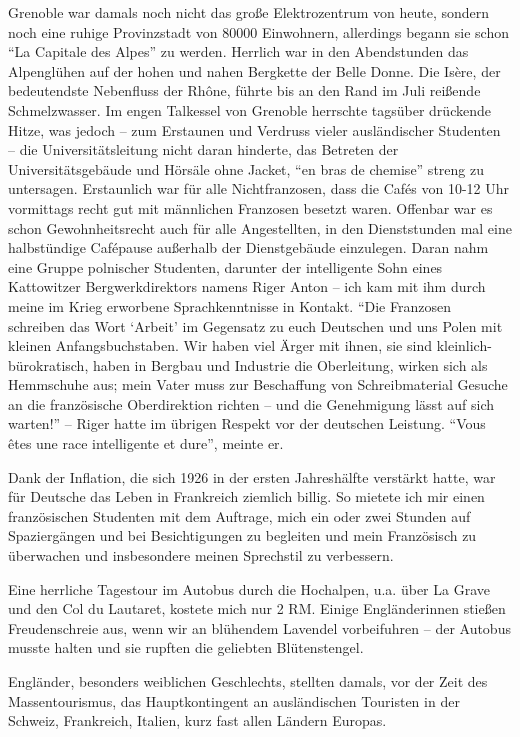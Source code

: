 Grenoble war damals noch nicht das große Elektrozentrum von heute, sondern noch eine ruhige Provinzstadt von \num{80000} Einwohnern, allerdings begann sie schon \enquote{La Capitale des Alpes} zu werden. Herrlich war in den Abendstunden das Alpenglühen auf der hohen und nahen Bergkette der Belle Donne. Die Isère, der bedeutendste Nebenfluss der Rhône, führte bis an den Rand im Juli reißende Schmelzwasser. Im engen Talkessel von Grenoble herrschte tagsüber drückende Hitze, was jedoch -- zum Erstaunen und Verdruss vieler ausländischer Studenten -- die Universitätsleitung nicht daran hinderte, das Betreten der Universitätsgebäude und Hörsäle ohne Jacket, \enquote{en bras de chemise} streng zu untersagen. Erstaunlich war für alle Nichtfranzosen, dass die Cafés von 10-12 Uhr vormittags recht gut mit männlichen Franzosen besetzt waren. Offenbar war es schon Gewohnheitsrecht auch für alle Angestellten, in den Dienststunden mal eine halbstündige Cafépause außerhalb der Dienstgebäude einzulegen. Daran nahm eine Gruppe polnischer Studenten, darunter der intelligente Sohn eines Kattowitzer Bergwerkdirektors namens Riger Anton -- ich kam mit ihm durch meine im Krieg erworbene Sprachkenntnisse in Kontakt. \enquote{Die Franzosen schreiben das Wort \enquote{Arbeit} im Gegensatz zu euch Deutschen und uns Polen mit kleinen Anfangsbuchstaben. Wir haben viel Ärger mit ihnen, sie sind kleinlich-bürokratisch, haben in Bergbau und Industrie die Oberleitung, wirken sich als Hemmschuhe aus; mein Vater muss zur Beschaffung von Schreibmaterial Gesuche an die französische Oberdirektion richten -- und die Genehmigung lässt auf sich warten!} -- Riger hatte im übrigen Respekt vor der deutschen Leistung. \enquote{Vous êtes une race intelligente et dure}, meinte er.

Dank der Inflation, die sich 1926 in der ersten Jahreshälfte verstärkt hatte, war für Deutsche das Leben in Frankreich ziemlich billig. So mietete ich mir einen französischen Studenten mit dem Auftrage, mich ein oder zwei Stunden auf Spaziergängen und bei Besichtigungen zu begleiten und mein Französisch zu überwachen und insbesondere meinen Sprechstil zu verbessern.

Eine herrliche Tagestour im Autobus durch die Hochalpen, u.a. über La Grave und den Col du Lautaret, kostete mich nur 2 RM. Einige Engländerinnen stießen Freudenschreie aus, wenn wir an blühendem Lavendel vorbeifuhren -- der Autobus musste halten und sie rupften die geliebten Blütenstengel.

Engländer, besonders weiblichen Geschlechts, stellten damals, vor der Zeit des Massentourismus, das Hauptkontingent an ausländischen Touristen in der Schweiz, Frankreich, Italien, kurz fast allen Ländern Europas.

